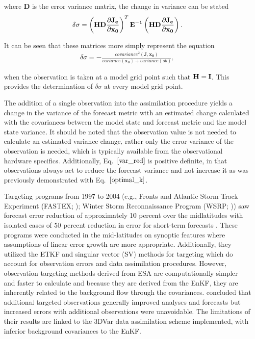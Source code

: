 \documentclass{ttuthes2007}
\newcommand{\tab}{\hspace*{2em}}  %
\begin{document}
where $\mathbf{D}$ is the error variance matrix, the change in variance can be stated
\begin{align}
	\delta \sigma = \left( \bf{H}\bf{D} \frac{\partial J_e}{\partial x_0} \right)^T \bf{E}^{-1} \left( \bf{H}\bf{D} \frac{\partial J_e}{\partial x_0} \right).
\end{align}

It can be seen that these matrices more simply represent the equation
\begin{align}\label{var_red}
	\delta \sigma = -\frac{covariance^2(\mathbf{J},\mathbf{x_0})}{variance(\mathbf{x_0}) + variance(ob)}, 
\end{align}

when the observation is taken at a model grid point such that $\bf{H}=\bf{I}$. This provides the determination of $\delta \sigma$ at every model grid point. 

\tab The addition of a single observation into the assimilation procedure yields a change in the variance of the forecast metric with an estimated change calculated with the covariances between the model state and forecast metric and the model state variance. It should be noted that the observation value is not needed to calculate an estimated variance change, rather only the error variance of the observation is needed, which is typically available from the observational hardware specifics. Additionally, Eq.~$\ref{var_red}$ is positive definite, in that observations always act to reduce the forecast variance and not increase it as was previously demonstrated with Eq.~$\ref{optimal_k}$. 

\tab Targeting programs from 1997 to 2004 (e.g., Fronts and Atlantic Storm-Track Experiment (FASTEX; \citealt{Szunyoghetal1999}); Winter Storm Reconnaissance Program (WSRP; \citealt{Szunyoghetal2000})) saw forecast error reduction of approximately 10 percent over the midlatitudes with isolated cases of 50 percent reduction in error for short-term forecasts \citep{Langland2005}. These programs were conducted in the mid-latitudes on synoptic features where assumptions of linear error growth are more appropriate. Additionally, they utilized the ETKF and singular vector (SV) methods for targeting \citep[e.g.,][]{Bishopetal2001,KhareandAnderson2006,Hamilletal2013} which do account for observation errors and data assimilation procedures. However, observation targeting methods derived from ESA are computationally simpler and faster to calculate and because they are derived from the EnKF, they are inherently related to the background flow through the covariances. \cite{MorssandEmanuel2002} concluded that additional targeted observations generally improved analyses and forecasts but increased errors with additional observations were unavoidable. The limitations of their results are linked to the 3DVar data assimilation scheme implemented, with inferior background covariances to the EnKF. \\
\end{document}
